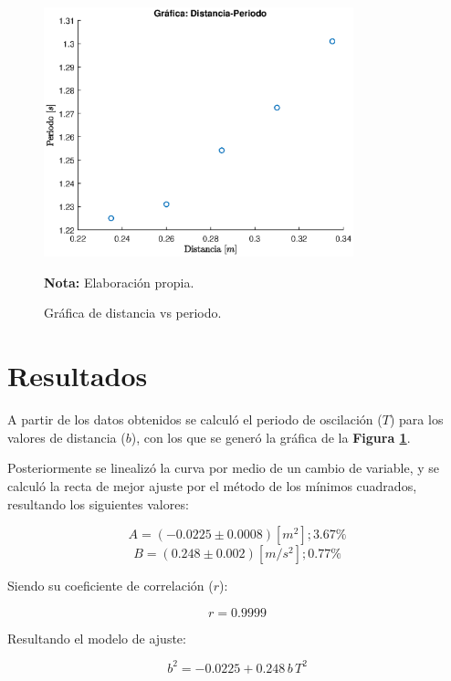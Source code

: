 \documentclass[letter,11pt]{article}
\newcommand{\source}[1]{\vspace{-11pt} \caption*{\small{\textbf{Nota:} {#1}}}}
\begin{document}
\begin{figure}
\centering
\includegraphics[width=0.80\textwidth]{resources/m1.1.eps}
\caption{Gráfica de distancia vs periodo.}
\label{figura5}
\source{Elaboración propia.}
\end{figure}

\section{Resultados}

A partir de los datos obtenidos se calculó el periodo de oscilación ($T$) para
los valores de distancia ($b$), con los que se generó la gráfica de la
\textbf{Figura \ref{figura5}}.

Posteriormente se linealizó la curva por medio de un cambio de variable, y se
calculó la recta de mejor ajuste por el método de los mínimos cuadrados,
resultando los siguientes valores:

\begin{equation*}
    A = (-0.0225 \pm 0.0008) [m^2]; 3.67\%
\end{equation*}
\begin{equation*}
    B = (0.248 \pm 0.002) [m/s^2]; 0.77\%
\end{equation*}
\vspace{0.10cm}

Siendo su coeficiente de correlación ($r$):

\begin{equation*}
    r = 0.9999
\end{equation*}
\vspace{0.10cm}

Resultando el modelo de ajuste:

\begin{equation*}
    b^2 = -0.0225 + 0.248\,b\,T^2
\end{equation*}
\vspace{0.10cm}
\end{document}

